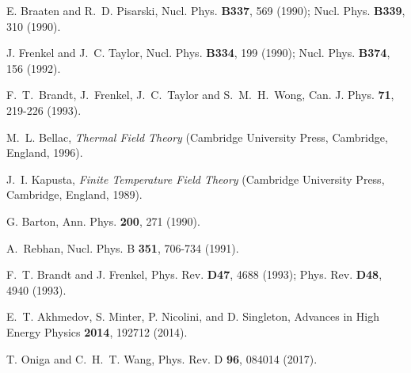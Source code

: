 \documentclass[longbibliography,groupedaddress,showpacs,showkeys,amssymb,eqsecnum,aps,nofootinbib,superscriptaddress]{revtex4}
\begin{document}
\begin{thebibliography}{10}
E. Braaten and R.~D. Pisarski, Nucl. Phys. {\bf B337},  569  (1990);
Nucl. Phys.  {\bf B339},  310 (1990).

J. Frenkel and J.~C. Taylor, Nucl. Phys. {\bf B334},  199  (1990);
%
Nucl. Phys. {\bf B374},  156  (1992).

F.~T.~Brandt, J.~Frenkel, J.~C.~Taylor and S.~M.~H.~Wong, 
Can. J. Phys. \textbf{71}, 219-226 (1993). 

M.~L. Bellac, {\em Thermal Field Theory} (Cambridge University Press, 
  Cambridge, England, 1996).

J.~I. Kapusta,
{\em Finite Temperature Field Theory} (Cambridge University Press, 
  Cambridge, England, 1989).

G. Barton, Ann. Phys. {\bf 200},  271  (1990).

A.~Rebhan,
Nucl. Phys. B \textbf{351}, 706-734 (1991).

F.~T. Brandt and J. Frenkel, Phys. Rev. {\bf D47},  4688  (1993);
Phys. Rev. {\bf D48},  4940 (1993).

E.~T. Akhmedov, S. Minter, P. Nicolini, and D. Singleton, Advances in High 
  Energy Physics {\bf 2014},  192712  (2014). 

T. Oniga and C.~H.~T. Wang, Phys. Rev. D {\bf 96},  084014  (2017).

\end{thebibliography}
\end{document}
